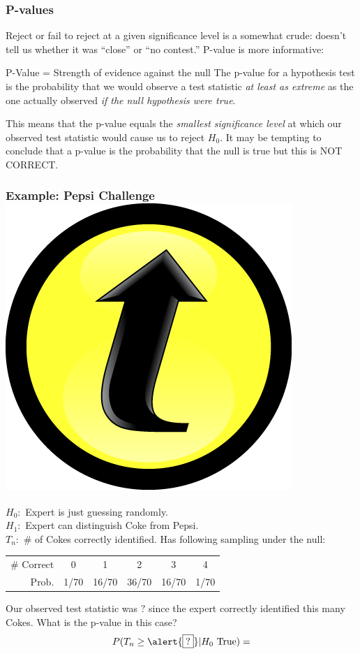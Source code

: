 \documentclass[handout]{beamer}
\begin{document}
\begin{frame}
\frametitle{P-values}
Reject or fail to reject at a given significance level is a somewhat crude: doesn't tell us whether it was ``close'' or ``no contest.'' P-value is more informative: \pause
	\begin{block}{P-Value = Strength of evidence against the null}
	The p-value for a hypothesis test is the probability that we would observe a test statistic \emph{at least as extreme} as the one actually observed \emph{if the null hypothesis were true}.
\end{block}
\pause
\vspace{1em}
\alert{This means that the p-value equals the \emph{smallest significance level} at which our observed test statistic would cause us to reject $H_0$. It may be tempting to conclude that a p-value is the probability that the null is true but this is NOT CORRECT.}
\end{frame}

\begin{frame}
\frametitle{Example: Pepsi Challenge \hfill \includegraphics[scale = 0.05]{./images/clicker}}
\footnotesize 
$H_0\colon$ Expert is just guessing randomly.\\
$H_1\colon$ Expert can distinguish Coke from Pepsi.\\
$T_n\colon$ \# of Cokes correctly identified. Has following sampling under the null:
		\begin{center}
		\begin{tabular}{rccccc}
		\hline \footnotesize
		\# Correct & 0 & 1 & 2 & 3 & 4\\
		Prob.&1/70 & 16/70 & 36/70 & 16/70 &1/70\\
		\hline
		\end{tabular}
	\end{center}
	\vspace{2em}
	\normalsize
	\alert{Our observed test statistic was $\boxed{?}$ since the expert correctly identified this many Cokes. What is the p-value in this case?}\pause
	\begin{eqnarray*}
		P(T_n \geq \alert{\boxed{?}}|H_0 \mbox{ True}) = 
	\end{eqnarray*}
\end{frame}

\end{document}
